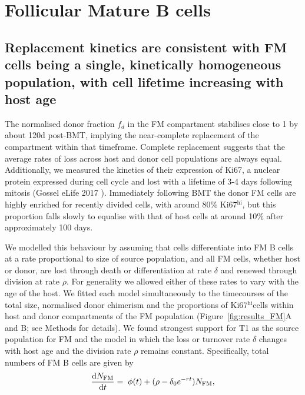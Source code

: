 \documentclass[11pt]{article}
\newcommand{\ddt}[1]{\ensuremath{\frac{{\rm d}#1}{{\rm d}t}}}  %
\newcommand{\red}[1]{{\color{red}{#1}}}
\newcommand{\be}{\begin{equation}}
\newcommand{\ee}{\end{equation}}
\newcommand{\khi}{Ki67$^\text{hi}$}
\newcommand{\klo}{Ki67$^\text{lo}$}
\begin{document}
\section*{Follicular Mature B cells}

\subsection*{Replacement kinetics are consistent with FM cells being a single, kinetically homogeneous population, with cell lifetime increasing with host age}
	The normalised donor fraction $f_{d}$ in the FM compartment stabilises close to 1 by about 120d post-BMT, implying the near-complete replacement of the compartment within that timeframe. Complete replacement suggests that the average rates of loss across host and donor cell populations are always equal.
	Additionally, we measured the kinetics of their expression of Ki67, a nuclear protein expressed during cell cycle and lost with a lifetime of 3-4 days following mitosis (Gossel eLife 2017 \red{and others - see refs in that paper}). Immediately following BMT the donor FM cells are highly enriched for recently divided cells, with around 80\% \khi, but this proportion falls slowly to equalise with that of host cells at around 10\% after approximately 100 days.
	
	
	We modelled this behaviour by assuming that cells differentiate into FM B cells at a rate proportional to size of source population, and all FM cells, whether host or donor, are lost through death or differentiation  at rate $\delta$ and renewed through division  at rate $\rho$. For generality we allowed either of these rates to vary with the age of the host. We fitted each model  simultaneously to the timecourses of the total size, normalised donor chimerism and the proportions of \khi cells within host and donor compartments of the FM population (Figure~\ref{fig:results_FM}A and B; see Methods for details). We found strongest support for T1 as the source population for FM and the model in which the loss or turnover rate $\delta$ changes with host age and the division rate $\rho$ remains constant. Specifically, total numbers of FM B cells are given by
	\be
	\ddt{N_\text{FM}} = \;  \phi(t) + (\rho - \delta_{0}e^{-rt}) N_\text{FM},
	\label{eq:FM_total}
	\ee
	
\end{document}
